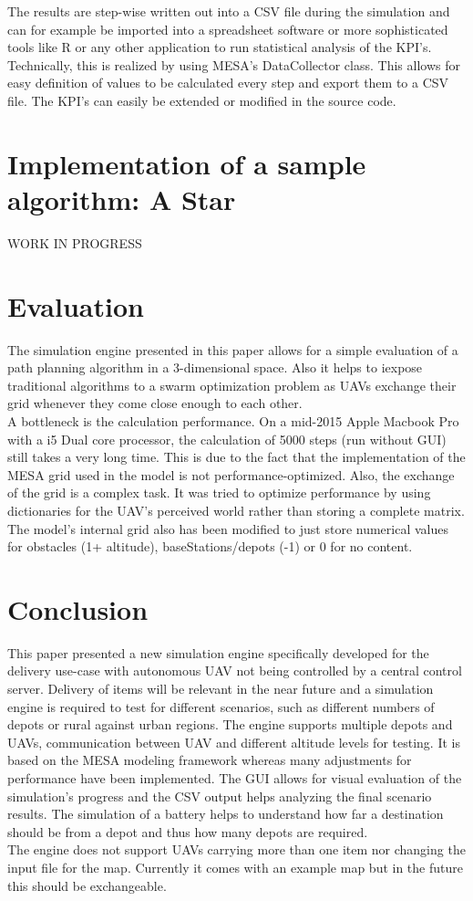 The results are step-wise written out into a CSV file during the simulation and can for example be imported into a spreadsheet software or more sophisticated tools like R or any other application to run statistical analysis of the KPI's. Technically, this is realized by using MESA's DataCollector class. This allows for easy definition of values to be calculated every step and export them to a CSV file. The KPI's can easily be extended or modified in the source code.

\section{Implementation of a sample algorithm: A Star}\label{sec:algorithm}
WORK IN PROGRESS


\section{Evaluation}\label{sec:evaluation}
The simulation engine presented in this paper allows for a simple evaluation of a path planning algorithm in a 3-dimensional space. Also it helps to iexpose traditional algorithms to a swarm optimization problem as UAVs exchange their grid whenever they come close enough to each other.\\
 A bottleneck is the calculation performance. On a mid-2015 Apple Macbook Pro with a i5 Dual core processor, the calculation of 5000 steps (run without GUI) still takes a very long time. This is due to the fact that the implementation of the MESA grid used in the model is not performance-optimized. Also, the exchange of the grid is a complex task. It was tried to optimize performance by using dictionaries for the UAV's perceived world rather than storing a complete matrix. The model's internal grid also has been modified to just store numerical values for obstacles (1+ altitude), baseStations/depots (-1) or 0 for no content.

\section{Conclusion}\label{sec:conclusion}
This paper presented a new simulation engine specifically developed for the delivery use-case with autonomous UAV not being controlled by a central control server. Delivery of items will be relevant in the near future and a simulation engine is required to test for different scenarios, such as different numbers of depots or rural against urban regions. The engine supports multiple depots and UAVs, communication between UAV and different altitude levels for testing. It is based on the MESA modeling framework whereas many adjustments for performance have been implemented. The GUI allows for visual evaluation of the simulation's progress and the CSV output helps analyzing the final scenario results. The simulation of a battery helps to understand how far a destination should be from a depot and thus how many depots are required. \\
The engine does not support UAVs carrying more than one item nor changing the input file for the map. Currently it comes with an example map but in the future this should be exchangeable. 



